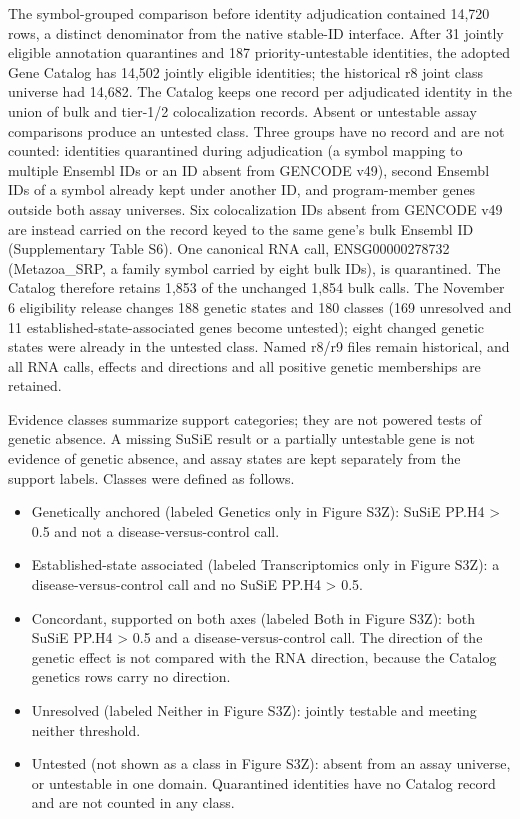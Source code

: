 The symbol-grouped comparison before identity adjudication contained 14,720 rows, a distinct denominator from the native stable-ID interface. After 31 jointly eligible annotation quarantines and 187 priority-untestable identities, the adopted Gene Catalog has 14,502 jointly eligible identities; the historical r8 joint class universe had 14,682. The Catalog keeps one record per adjudicated identity in the union of bulk and tier-1/2 colocalization records. Absent or untestable assay comparisons produce an untested class. Three groups have no record and are not counted: identities quarantined during adjudication (a symbol mapping to multiple Ensembl IDs or an ID absent from GENCODE v49), second Ensembl IDs of a symbol already kept under another ID, and program-member genes outside both assay universes. Six colocalization IDs absent from GENCODE v49 are instead carried on the record keyed to the same gene's bulk Ensembl ID (Supplementary Table S6). One canonical RNA call, ENSG00000278732 (Metazoa\_\allowbreak{}SRP, a family symbol carried by eight bulk IDs), is quarantined. The Catalog therefore retains 1,853 of the unchanged 1,854 bulk calls. The November 6 eligibility release changes 188 genetic states and 180 classes (169 unresolved and 11 established-state-associated genes become untested); eight changed genetic states were already in the untested class. Named r8/r9 files remain historical, and all RNA calls, effects and directions and all positive genetic memberships are retained.

Evidence classes summarize support categories; they are not powered tests of genetic absence. A missing SuSiE result or a partially untestable gene is not evidence of genetic absence, and assay states are kept separately from the support labels. Classes were defined as follows.

\begin{itemize}
\tightlist
\item
  Genetically anchored (labeled Genetics only in Figure S3Z): SuSiE PP.H4 \textgreater{} 0.5 and not a disease-versus-control call.
\item
  Established-state associated (labeled Transcriptomics only in Figure S3Z): a disease-versus-control call and no SuSiE PP.H4 \textgreater{} 0.5.
\item
  Concordant, supported on both axes (labeled Both in Figure S3Z): both SuSiE PP.H4 \textgreater{} 0.5 and a disease-versus-control call. The direction of the genetic effect is not compared with the RNA direction, because the Catalog genetics rows carry no direction.
\item
  Unresolved (labeled Neither in Figure S3Z): jointly testable and meeting neither threshold.
\item
  Untested (not shown as a class in Figure S3Z): absent from an assay universe, or untestable in one domain. Quarantined identities have no Catalog record and are not counted in any class.
\end{itemize}

